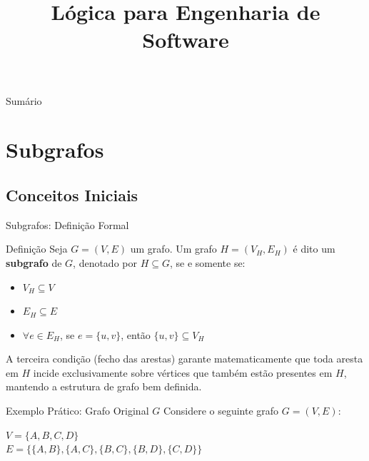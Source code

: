 \documentclass[9pt]{beamer}
\title[Presentation]{Lógica para Engenharia de Software} %
\institute[UniRV]{\textbf{\large  \textcolor{structure}{\textbf{\large
Subgrafos, Caminhos, Ciclos, Árvore Geradora Mínima com Prim e Kruskal, Isomorfismo de Grafos e problema do Caixeiro Viajante
}}} %
\\ \qquad
\\Professor: Me. Sergio Souza Novak 
\\Faculdade de Engenharia de Software}
\date{}
\begin{document}
\begin{frame}
\titlepage
\end{frame}

\begin{frame}{Sumário}
    \tableofcontents[hideallsubsections]
\end{frame}
 
\section{Subgrafos}
\subsection{Conceitos Iniciais}

\begin{frame}{Subgrafos: Definição Formal}
    \begin{block}{Definição}
        Seja $G = (V, E)$ um grafo. Um grafo $H = (V_H, E_H)$ é dito um \textbf{subgrafo} de $G$, denotado por $H \subseteq G$, se e somente se:
        \begin{itemize}
            \item $V_H \subseteq V$
            \item $E_H \subseteq E$
            \item $\forall e \in E_H$, se $e = \{u, v\}$, então $\{u, v\} \subseteq V_H$
        \end{itemize}
    \end{block}
    \vspace{0.3cm}
    A terceira condição (fecho das arestas) garante matematicamente que toda aresta em $H$ incide exclusivamente sobre vértices que também estão presentes em $H$, mantendo a estrutura de grafo bem definida.
\end{frame}

\begin{frame}{Exemplo Prático: Grafo Original $G$}
    Considere o seguinte grafo $G = (V, E)$:
    \vspace{0.5cm}
    \begin{center}
    \end{center}
    $V = \{A, B, C, D\}$ \\
    $E = \{\{A,B\}, \{A,C\}, \{B,C\}, \{B,D\}, \{C,D\}\}$
\end{frame}
\end{document}
